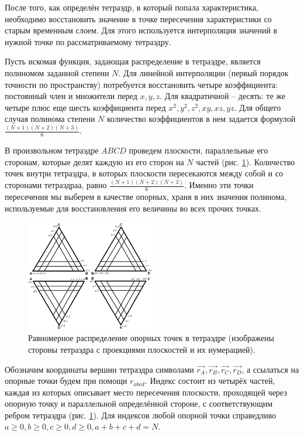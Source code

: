 После того, как определён тетраэдр, в который попала характеристика, необходимо восстановить значение в точке пересечения характеристики со старым временным слоем. Для этого используется интерполяция значений в нужной точке по рассматриваемому тетраэдру.

Пусть искомая функция, задающая распределение в тетраэдре, является полиномом заданной степени $N$. Для линейной интерполяции (первый порядок точности по пространству) потребуется восстановить четыре коэффициента: постоянный член и множители перед $x, y, z$. Для квадратичной -- десять: те же четыре плюс еще шесть коэффициента перед $x^2, y^2, z^2, xy, xz, yz$. Для общего случая полинома степени $N$ количество коэффициентов в нем задается формулой $\frac{(N+1)(N+2)(N+3)}{6}$.

В произвольном тетраэдре $ABCD$ проведем плоскости, параллельные его сторонам, которые делят каждую из его сторон на $N$ частей (рис. \ref{pic:tetr-interpolation-base-points}). Количество точек внутри тетраэдра, в которых плоскости пересекаются между собой и со сторонами тетраэдраа, равно $\frac{(N+1)(N+2)(N+3)}{6}$. Именно эти точки пересечения мы выберем в качестве опорных, храня в них значения полинома, используемые для восстановления его величины во всех прочих точках.

\begin{figure}[h]
\centering
\includegraphics[width=0.5\textwidth]{png/tetr-interpolation-base-points.png}
\caption{Равномерное распределение опорных точек в тетраэдре (изображены стороны тетраэдра с проекциями плоскостей и их нумерацией).}
\label{pic:tetr-interpolation-base-points}
\end{figure}

Обозначим координаты вершин тетраэдра символами $\vec{r_A}, \vec{r_B}, \vec{r_C}, \vec{r_D}$, а ссылаться на опорные точки будем при помощи $r_{abcd}$. Индекс состоит из четырёх частей, каждая из которых описывает место пересечения плоскости, проходящей через опорную точку и параллельной определённой стороне, с соответствующим ребром тетраэдра (рис. \ref{pic:tetr-interpolation-base-points}). Для индексов любой опорной точки справедливо $a \ge 0, b \ge 0, c \ge 0, d \ge 0, a+b+c+d = N$.


